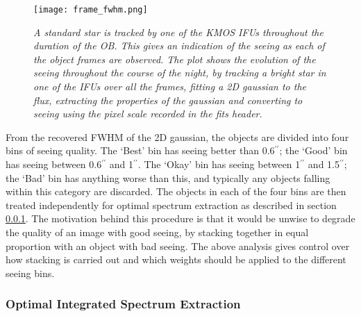 \documentclass{literature}
\begin{document}
\begin{figure}[!htp]
\centering
\texttt{[image: frame\_fwhm.png]}
\caption{\footnotesize{\emph{A standard star is tracked by one of the KMOS IFUs throughout the duration of the OB. This gives an indication of the seeing as each of the object frames are observed. The plot shows the evolution of the seeing throughout the course of the night, by tracking a bright star in one of the IFUs over all the frames, fitting a 2D gaussian to the flux, extracting the properties of the gaussian and converting to seeing using the pixel scale recorded in the fits header.}}}
\label{fig:fwhm_track}
\end{figure}

From the recovered FWHM of the 2D gaussian, the objects are divided into four bins of seeing quality. The `Best' bin has seeing better than 0.6$^{\prime\prime}$; the `Good' bin has seeing between 0.6$^{\prime\prime}$ and 1$^{\prime\prime}$. The `Okay' bin has seeing between 1$^{\prime\prime}$ and 1.5$^{\prime\prime}$; the `Bad' bin has anything worse than this, and typically any objects falling within this category are discarded. The objects in each of the four bins are then treated independently for optimal spectrum extraction as described in section \ref{subsubsec:optimal_spec_extract}. The motivation behind this procedure is that it would be unwise to degrade the quality of an image with good seeing, by stacking together in equal proportion with an object with bad seeing. The above analysis gives control over how stacking is carried out and which weights should be applied to the different seeing bins.  


\subsubsection{Optimal Integrated Spectrum Extraction}\label{subsubsec:optimal_spec_extract}
\end{document}
